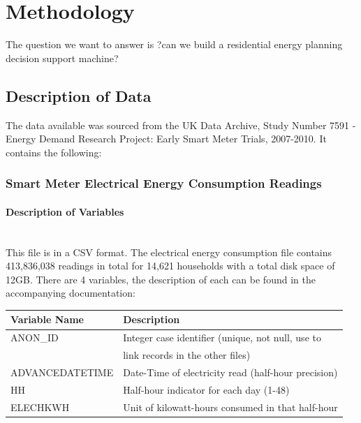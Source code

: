 \chapter{Methodology}
The question we want to answer is ?can we build a residential energy planning decision support machine?

\section{Description of Data}
    The data available was sourced from the UK Data Archive, Study Number 7591 - Energy Demand Research Project: Early Smart Meter Trials, 2007-2010. It contains the following:
    \subsection{Smart Meter Electrical Energy Consumption Readings}
        \subsubsection{Description of Variables}
    
            \\
            This file is in a CSV format. The electrical energy consumption file contains 413,836,038 readings in total for 14,621 households with a total disk space of 12GB. There are 4 variables, the description of each can be found in the accompanying documentation: 
        \begin{center}
            \begin{tabular}{|l | l|}
            \hline
             \textbf{Variable Name} & \textbf{Description} \\
             \hline\hline
             ANON\_ID & Integer case identifier (unique, not null, use to \\&  link records in the other files) \\ 
             \hline
             ADVANCEDATETIME & Date-Time of electricity read (half-hour precision) \\
             \hline
             HH & Half-hour indicator for each day (1-48) \\
             \hline
             ELECHKWH & Unit of kilowatt-hours consumed in that half-hour \\
             \hline
            \end{tabular}
        \end{center}
        
